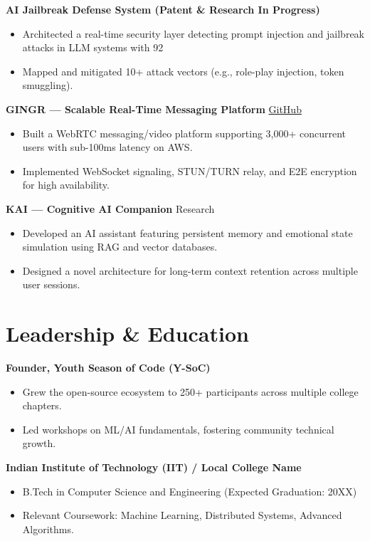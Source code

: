 \documentclass[10pt, letterpaper]{article}
\begin{document}
\textbf{AI Jailbreak Defense System (Patent & Research In Progress)}
\begin{itemize}[leftmargin=*, itemsep=1pt]
    \item Architected a real-time security layer detecting prompt injection and jailbreak attacks in LLM systems with 92%
    \item Mapped and mitigated 10+ attack vectors (e.g., role-play injection, token smuggling).
\end{itemize}

\textbf{GINGR — Scalable Real-Time Messaging Platform} \hfill \href{https://github.com/PunyaMittal}{GitHub}
\begin{itemize}[leftmargin=*, itemsep=1pt]
    \item Built a WebRTC messaging/video platform supporting 3,000+ concurrent users with sub-100ms latency on AWS.
    \item Implemented WebSocket signaling, STUN/TURN relay, and E2E encryption for high availability.
\end{itemize}

\textbf{KAI — Cognitive AI Companion} \hfill Research
\begin{itemize}[leftmargin=*, itemsep=1pt]
    \item Developed an AI assistant featuring persistent memory and emotional state simulation using RAG and vector databases.
    \item Designed a novel architecture for long-term context retention across multiple user sessions.
\end{itemize}

\section*{Leadership & Education}

\textbf{Founder, Youth Season of Code (Y-SoC)}
\begin{itemize}[leftmargin=*, itemsep=1pt]
    \item Grew the open-source ecosystem to 250+ participants across multiple college chapters.
    \item Led workshops on ML/AI fundamentals, fostering community technical growth.
\end{itemize}

\textbf{Indian Institute of Technology (IIT) / Local College Name}
\begin{itemize}
    \item B.Tech in Computer Science and Engineering (Expected Graduation: 20XX)
    \item Relevant Coursework: Machine Learning, Distributed Systems, Advanced Algorithms.
\end{itemize}
\end{document}
